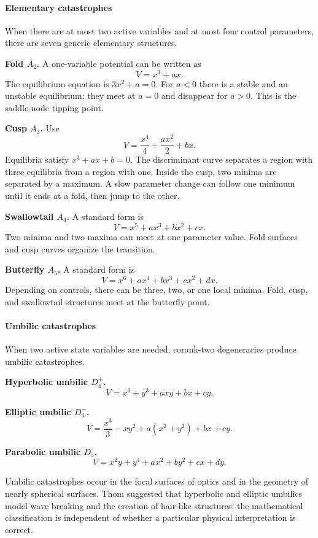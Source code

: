 \paragraph{Elementary catastrophes}

When there are at most two active variables and at most four control parameters, there are seven generic elementary structures.

\textbf{Fold $A_2$.} A one-variable potential can be written as
\[
 V=x^3+ax.
\]
The equilibrium equation is $3x^2+a=0$. For $a<0$ there is a stable and an unstable equilibrium; they meet at $a=0$ and disappear for $a>0$. This is the saddle-node tipping point.

\textbf{Cusp $A_3$.} Use
\[
 V=\frac{x^4}{4}+\frac{a x^2}{2}+bx.
\]
Equilibria satisfy $x^3+ax+b=0$. The discriminant curve separates a region with three equilibria from a region with one. Inside the cusp, two minima are separated by a maximum. A slow parameter change can follow one minimum until it ends at a fold, then jump to the other.

\textbf{Swallowtail $A_4$.} A standard form is
\[
 V=x^5+ax^3+bx^2+cx.
\]
Two minima and two maxima can meet at one parameter value. Fold surfaces and cusp curves organize the transition.

\textbf{Butterfly $A_5$.} A standard form is
\[
 V=x^6+ax^4+bx^3+cx^2+dx.
\]
Depending on controls, there can be three, two, or one local minima. Fold, cusp, and swallowtail structures meet at the butterfly point.

\paragraph{Umbilic catastrophes}

When two active state variables are needed, corank-two degeneracies produce umbilic catastrophes.

\textbf{Hyperbolic umbilic $D_4^+$.}
\[
 V=x^3+y^3+axy+bx+cy.
\]

\textbf{Elliptic umbilic $D_4^-$.}
\[
 V=\frac{x^3}{3}-xy^2+a(x^2+y^2)+bx+cy.
\]

\textbf{Parabolic umbilic $D_5$.}
\[
 V=x^2y+y^4+ax^2+by^2+cx+dy.
\]

Umbilic catastrophes occur in the focal surfaces of optics and in the geometry of nearly spherical surfaces. Thom suggested that hyperbolic and elliptic umbilics model wave breaking and the creation of hair-like structures; the mathematical classification is independent of whether a particular physical interpretation is correct.

